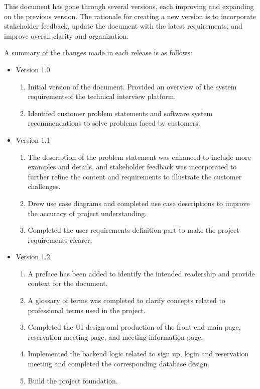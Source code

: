 \documentclass{article}
\begin{document}
This document has gone through several versions, each improving and expanding on the previous 
version. The rationale for creating a new version is to incorporate stakeholder feedback, update 
the document with the latest requirements, and improve overall clarity and organization.

A summary of the changes made in each release is as follows:

\begin{itemize}
    \item Version 1.0
    \begin{enumerate}
        \item Initial version of the document. Provided an overview of the system requirementsof the technical interview platform.
        \item Identifed customer problem statements and software system recommendations to solve problems faced by customers.
    \end{enumerate}
    \item Version 1.1
    \begin{enumerate}
        \item The description of the problem statement was enhanced to include more examples and details, and stakeholder feedback was incorporated to further refine the content and requirements to illustrate the customer challenges.
        \item Drew use case diagrams and completed use case descriptions to improve the accuracy of project understanding.
        \item Completed the user requirements definition part to make the project requirements clearer.
    \end{enumerate}
    \item Version 1.2
    \begin{enumerate}
        \item A preface has been added to identify the intended readership and provide context for the document.
        \item A glossary of terms was completed to clarify concepts related to professional terms used in the project.
        \item Completed the UI design and production of the front-end main page, reservation meeting page, and meeting information page.
        \item Implemented the backend logic related to sign up, login and reservation meeting and completed the corresponding database design.
        \item Build the project foundation.

\end{enumerate}
\end{itemize}
\end{document}
